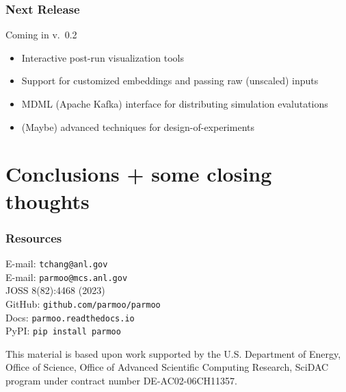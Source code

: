 \documentclass[aspectratio=169]{beamer}
\begin{document}
\begin{frame}\frametitle{Next Release}

Coming in v.~0.2
\begin{itemize}
\item Interactive post-run visualization tools
\item Support for customized embeddings and passing raw (unscaled) inputs
\item MDML (Apache Kafka) interface for distributing simulation evalutations
\item (Maybe) advanced techniques for design-of-experiments
\end{itemize}
\end{frame}

\section{Conclusions + some closing thoughts}

\begin{frame}\frametitle{Resources}
\begin{center}
{\large
E-mail: {\tt tchang@anl.gov}\\
E-mail: {\tt parmoo@mcs.anl.gov}\\
\bigskip
\bigskip
JOSS 8(82):4468 (2023)\\
\bigskip
\bigskip
GitHub: {\tt github.com/parmoo/parmoo}\\
Docs: {\tt parmoo.readthedocs.io}\\
PyPI: {\tt pip install parmoo}}

\bigskip
\bigskip

{\small This material is based upon work supported by the U.S. Department of Energy, Office of Science, Office of Advanced Scientific Computing Research, SciDAC program under contract number DE-AC02-06CH11357.}
\end{center}
\end{frame}
\end{document}
